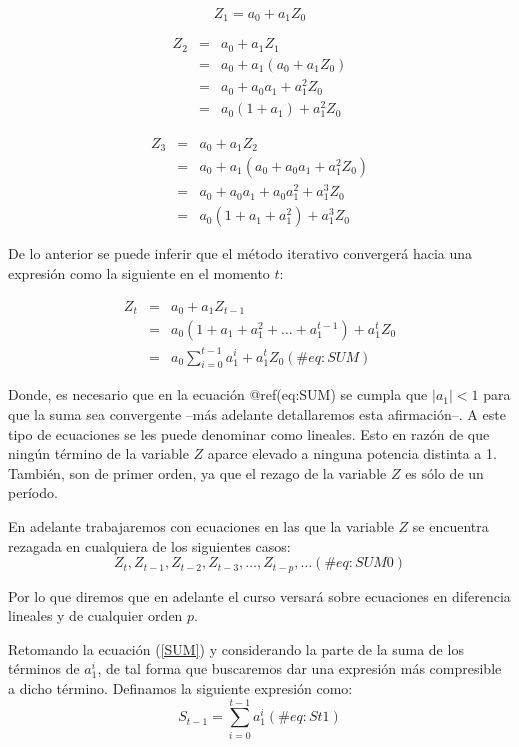 \documentclass[
  a4paper,
]{article}
\begin{document}
\begin{equation*}
    Z_1 = a_0 + a_1 Z_0
\end{equation*}

\begin{eqnarray*}
Z_2 & = & a_0 + a_1 Z_1 \\
    & = & a_0 + a_1 (a_0 + a_1 Z_0) \\
    & = & a_0 +  a_0 a_1 + a^2_1 Z_0 \\
    & = & a_0 (1 + a_1) + a^2_1 Z_0
\end{eqnarray*}

\begin{eqnarray*}
Z_3 & = & a_0 + a_1 Z_2 \\
    & = & a_0 + a_1 (a_0 +  a_0 a_1 + a^2_1 Z_0) \\
    & = & a_0 +  a_0 a_1 + a_0 a^2_1 + a^3_1 Z_0 \\
    & = & a_0 (1 + a_1 + a^2_1) + a^3_1 Z_0
\end{eqnarray*}

De lo anterior se puede inferir que el método iterativo convergerá hacia
una expresión como la siguiente en el momento \(t\):

\begin{eqnarray}
Z_t & = & a_0 + a_1 Z_{t-1} \nonumber \\
    & = & a_0 (1 + a_1 + a^2_1 + \ldots + a^{t-1}_1) + a^t_1 Z_0 \nonumber \\
    & = & a_0 \sum^{t-1}_{i = 0}{a^i_1} + a^t_1 Z_0
    (\#eq:SUM)
\end{eqnarray}

Donde, es necesario que en la ecuación @ref(eq:SUM) se cumpla que
\(\lvert{a_1}\lvert < 1\) para que la suma sea convergente --más
adelante detallaremos esta afirmación--. A este tipo de ecuaciones se
les puede denominar como lineales. Esto en razón de que ningún término
de la variable \(Z\) aparce elevado a ninguna potencia distinta a 1.
También, son de primer orden, ya que el rezago de la variable \(Z\) es
sólo de un período.

En adelante trabajaremos con ecuaciones en las que la variable \(Z\) se
encuentra rezagada en cualquiera de los siguientes casos: \[
    Z_t, Z_{t-1}, Z_{t-2}, Z_{t-3}, \ldots, Z_{t-p}, \ldots
    (\#eq:SUM0)
\]

Por lo que diremos que en adelante el curso versará sobre ecuaciones en
diferencia lineales y de cualquier orden \(p\).

Retomando la ecuación (\ref{SUM}) y considerando la parte de la suma de
los términos de \(a^i_1\), de tal forma que buscaremos dar una expresión
más compresible a dicho término. Definamos la siguiente expresión como:
\[
    S_{t-1} = \sum^{t-1}_{i = 0}{a^i_1}
    (\#eq:St1)
\]
\end{document}
